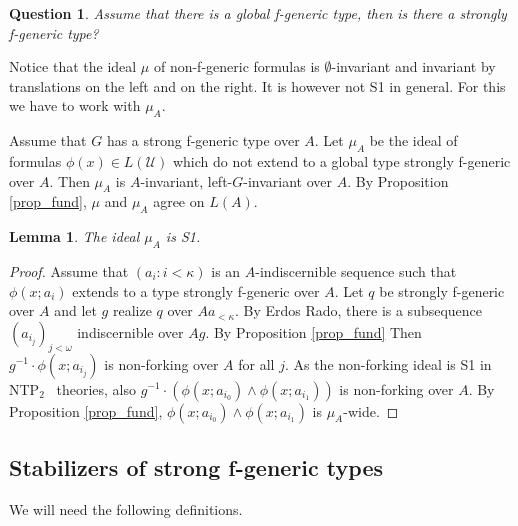 \documentclass[12pt]{article}
\newtheorem{lemme}[thm]{Lemma}
\newtheorem{question}[thm]{Question}
\theoremstyle{definition}
\theoremstyle{mystyle}
\theoremstyle{remark}
\newcommand{\monster}{\mathcal U}
\newcommand{\ntp}{NTP$_2$ }
\begin{document}
\begin{question}
Assume that there is a global f-generic type, then is there a strongly f-generic type?
\end{question}

Notice that the ideal $\mu$ of non-f-generic formulas is $\emptyset$-invariant and invariant by translations on the left and on the right. It is however not S1 in general. For this we have to work with $\mu_A$.

Assume that $G$ has a strong f-generic type over $A$. Let $\mu_A$ be the ideal of formulas $\phi(x)\in L(\monster)$ which do not extend to a global type strongly f-generic over $A$. Then $\mu_A$ is $A$-invariant, left-$G$-invariant over $A$. By Proposition \ref{prop_fund}, $\mu$ and $\mu_A$ agree on $L(A)$.

\begin{lemme}\label{lem_s1}
The ideal $\mu_A$ is S1.
\end{lemme}
\begin{proof}
Assume that $(a_i:i<\kappa)$ is an $A$-indiscernible sequence such
that $\phi(x;a_i)$ extends to a type strongly f-generic over $A$.
Let $q$ be strongly f-generic over $A$ and let $g$ realize $q$
over $Aa_{<\kappa}$. By Erdos Rado, there is a subsequence
$(a_{i_j})_{j<\omega}$ indiscernible over $Ag$. By Proposition
\ref{prop_fund} Then $g^{-1}\cdot \phi(x;a_{i_j})$ is non-forking
over $A$ for all $j$. As the non-forking ideal is S1 in
\ntp~theories, also $g^{-1}\cdot (\phi(x;a_{i_0})\wedge
\phi(x;a_{i_1}))$ is non-forking over $A$. By Proposition
\ref{prop_fund}, $\phi(x;a_{i_0})\wedge \phi(x;a_{i_1})$ is
$\mu_A$-wide.
\end{proof}



\subsection{Stabilizers of strong f-generic types}

We will need the following definitions.
\end{document}
